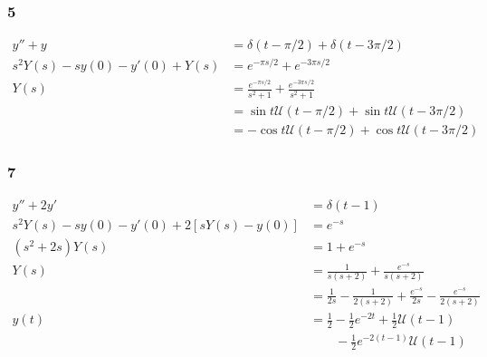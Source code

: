 \documentclass{article}
\begin{document}
\subsubsection{5}

\begin{align*}
  y'' + y                          & = \delta (t - \pi / 2) + \delta (t - 3 \pi / 2)                        \\
  s^2 Y(s) - s y(0) - y'(0) + Y(s) & = e^{-\pi s / 2} + e^{-3 \pi s / 2}                                    \\
  Y(s)                             & = \frac{e^{-\pi s / 2}}{s^2 + 1} + \frac{e^{-3 \pi s / 2}}{s^2 + 1}    \\
                                   & = \sin t \mathcal{U}(t - \pi / 2) + \sin t \mathcal{U}(t - 3 \pi / 2)  \\
                                   & = -\cos t \mathcal{U}(t - \pi / 2) + \cos t \mathcal{U}(t - 3 \pi / 2)
\end{align*}

\subsubsection{7}

\begin{align*}
  y'' + 2 y'                                    & = \delta(t - 1)                                                                       \\
  s^2 Y(s) - s y(0) - y'(0) + 2 [s Y(s) - y(0)] & = e^{-s}                                                                              \\
  (s^2 + 2 s) Y(s)                              & = 1 + e^{-s}                                                                          \\
  Y(s)                                          & = \frac{1}{s (s + 2)} + \frac{e^{-s}}{s (s + 2)}                                      \\
                                                & = \frac{1}{2 s} - \frac{1}{2 (s + 2)} + \frac{e^{-s}}{2 s} - \frac{e^{-s}}{2 (s + 2)} \\
  y(t)                                          & = \frac{1}{2} - \frac{1}{2} e^{-2 t} + \frac{1}{2} \mathcal{U}(t - 1)                 \\
                                                & \qquad - \frac{1}{2} e^{-2 (t - 1)} \mathcal{U}(t - 1)
\end{align*}
\end{document}

